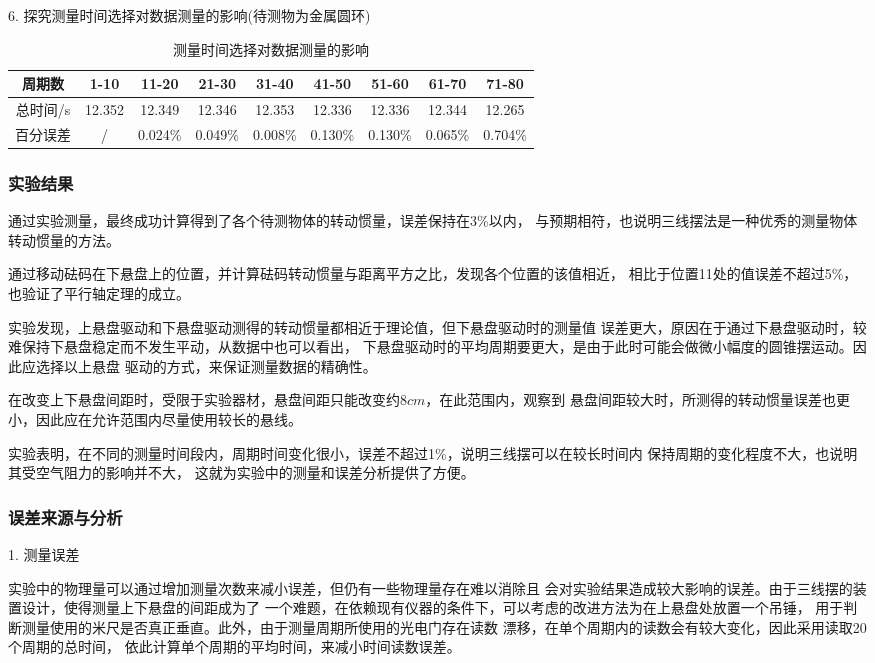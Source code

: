 \documentclass[12pt,hyperref,a4paper,UTF8]{ctexart}
\begin{document}
6. 探究测量时间选择对数据测量的影响(待测物为金属圆环)

\begin{table}[h!]
\centering
\begin{tabular}{|c|c|c|c|c|c|c|c|c|}
    \hline
    周期数 & 1-10 & 11-20 & 21-30 & 31-40 & 41-50 & 51-60 & 61-70 & 71-80 \\
    \hline
    总时间/s & 12.352 & 12.349 & 12.346 & 12.353 & 12.336 & 12.336 & 12.344 & 12.265 \\
    \hline
    百分误差 & / & 0.024\% & 0.049\% & 0.008\% & 0.130\% & 0.130\% & 0.065\% & 0.704\% \\
    \hline
\end{tabular}
\caption{测量时间选择对数据测量的影响}
\end{table}

\subsubsection{实验结果}

通过实验测量，最终成功计算得到了各个待测物体的转动惯量，误差保持在3\%以内，
与预期相符，也说明三线摆法是一种优秀的测量物体转动惯量的方法。

通过移动砝码在下悬盘上的位置，并计算砝码转动惯量与距离平方之比，发现各个位置的该值相近，
相比于位置11处的值误差不超过5\%，也验证了平行轴定理的成立。

实验发现，上悬盘驱动和下悬盘驱动测得的转动惯量都相近于理论值，但下悬盘驱动时的测量值
误差更大，原因在于通过下悬盘驱动时，较难保持下悬盘稳定而不发生平动，从数据中也可以看出，
下悬盘驱动时的平均周期要更大，是由于此时可能会做微小幅度的圆锥摆运动。因此应选择以上悬盘
驱动的方式，来保证测量数据的精确性。

在改变上下悬盘间距时，受限于实验器材，悬盘间距只能改变约$8cm$，在此范围内，观察到
悬盘间距较大时，所测得的转动惯量误差也更小，因此应在允许范围内尽量使用较长的悬线。

实验表明，在不同的测量时间段内，周期时间变化很小，误差不超过1\%，说明三线摆可以在较长时间内
保持周期的变化程度不大，也说明其受空气阻力的影响并不大，
这就为实验中的测量和误差分析提供了方便。

\subsubsection{误差来源与分析}

1. 测量误差

实验中的物理量可以通过增加测量次数来减小误差，但仍有一些物理量存在难以消除且
会对实验结果造成较大影响的误差。由于三线摆的装置设计，使得测量上下悬盘的间距成为了
一个难题，在依赖现有仪器的条件下，可以考虑的改进方法为在上悬盘处放置一个吊锤，
用于判断测量使用的米尺是否真正垂直。此外，由于测量周期所使用的光电门存在读数
漂移，在单个周期内的读数会有较大变化，因此采用读取20个周期的总时间，
依此计算单个周期的平均时间，来减小时间读数误差。
\end{document}
